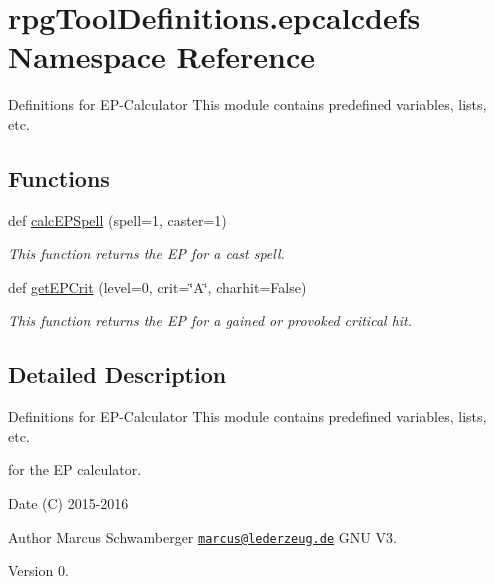 \hypertarget{namespacerpgToolDefinitions_1_1epcalcdefs}{}\section{rpg\+Tool\+Definitions.\+epcalcdefs Namespace Reference}
\label{namespacerpgToolDefinitions_1_1epcalcdefs}


Definitions for E\+P-\/\+Calculator This module contains predefined variables, lists, etc.  


\subsection*{Functions}
\begin{DoxyCompactItemize}
\item 
def \hyperlink{namespacerpgToolDefinitions_1_1epcalcdefs_a0c04e5f498010d3ae4df2afba7b414c8}{calc\+E\+P\+Spell} (spell=1, caster=1)
\begin{DoxyCompactList}\small\item\em This function returns the EP for a cast spell. \end{DoxyCompactList}\item 
def \hyperlink{namespacerpgToolDefinitions_1_1epcalcdefs_abf04e7e0e98cc6f560af932d5117f716}{get\+E\+P\+Crit} (level=0, crit=\char`\"{}A\char`\"{}, charhit=False)
\begin{DoxyCompactList}\small\item\em This function returns the EP for a gained or provoked critical hit. \end{DoxyCompactList}\end{DoxyCompactItemize}


\subsection{Detailed Description}
Definitions for E\+P-\/\+Calculator This module contains predefined variables, lists, etc. 

for the EP calculator.

\begin{DoxyDate}{Date}
(C) 2015-\/2016 
\end{DoxyDate}
\begin{DoxyAuthor}{Author}
Marcus Schwamberger  \href{mailto:marcus@lederzeug.de}{\tt marcus@lederzeug.\+de}  G\+NU V3. 
\end{DoxyAuthor}
\begin{DoxyVersion}{Version}
0. 
\end{DoxyVersion}


